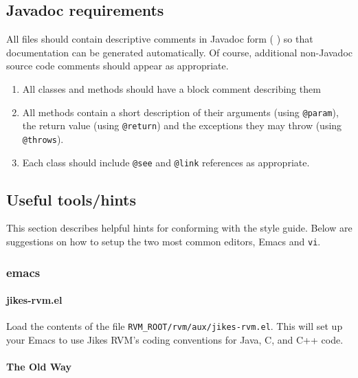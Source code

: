 \subsection {Javadoc requirements}

All files should contain descriptive comments
in Javadoc\TMweb{} form (
\xlink{{\tt \JavadocURL}} {\JavadocURL}
) so
that documentation can be generated automatically.  Of course,
additional non-Javadoc source code comments should appear as
appropriate.

\begin{enumerate}
\item All classes and methods should have a block comment describing
them
\item All methods contain a short description of their arguments
(using {\tt @param}), the return value (using {\tt @return}) and the
exceptions they may throw (using {\tt @throws}).
\item Each class should include {\tt @see} and {\tt @link} 
references as appropriate.
\end{enumerate}

\subsection {Useful tools/hints}%

This section describes helpful hints for conforming with the style
guide.  Below are suggestions on how to setup the two most common
editors, Emacs and \texttt{vi}. 

\subsubsection{emacs} 

\paragraph{jikes-rvm.el}

Load the contents of the
file \texttt{RVM\_ROOT/rvm/aux/jikes-rvm.el}.  This will set up your
Emacs to use Jikes RVM's coding conventions for Java, C, and C++ code.

\paragraph{The Old Way}

